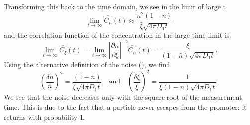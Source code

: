 Transforming this back to the time domain, we see in the limit of large t
\begin{equation}
 \lim_{t \rightarrow \infty} \hat{C_n}(t) \approx \frac{\bar{n}^2(1-\bar{n})}{\bar{\xi} \sqrt{4 \pi D_1 t}}
\end{equation}
and the correlation function of the concentration in the large time limit is
\begin{equation}
 \lim_{t \rightarrow \infty} \hat{C_{\xi}}(t) = \lim_{t \rightarrow \infty} \left| \frac{\partial n}{\partial \xi} \right|^{-2} \hat{C_n}(t) = \frac{\bar{\xi}}{(1 - \bar{n}) \sqrt{4 \pi D_1 t}}.
\end{equation}
Using the alternative definition of the noise (), we find
\begin{equation}
 \left( \frac{\delta n}{\bar{n}} \right)^2 =  \frac{(1-\bar{n})}{\bar{\xi} \sqrt{4 \pi D_1 t}} \quad \text{and} \quad \left( \frac{\delta \xi}{\bar{\xi}} \right)^2 = \frac{1}{ \bar{\xi} (1 - \bar{n}) \sqrt{4 \pi D_1 t}}.
\end{equation}
We see that the noise decreases only with the square root of the measurement time. This is due to the fact that a particle never escapes from the promoter: it returns with probability 1.

